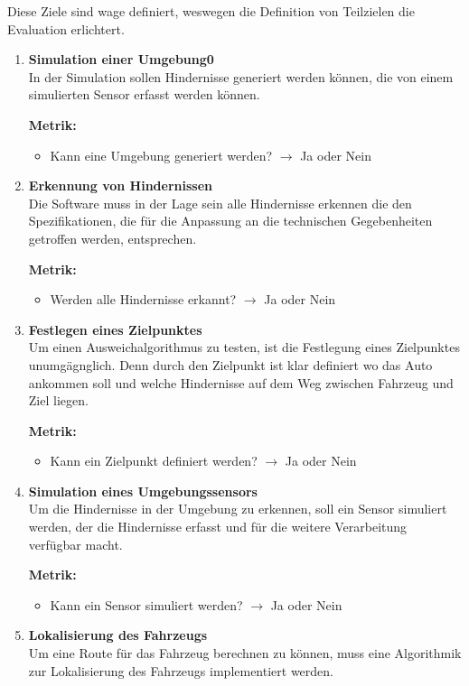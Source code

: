 Diese Ziele sind wage definiert, weswegen die Definition von Teilzielen die Evaluation erlichtert.
\begin{enumerate}[leftmargin=*]
    \item \textbf{Simulation einer Umgebung0}\\
    In der Simulation sollen Hindernisse generiert werden können, die von einem simulierten Sensor erfasst werden können.

    \textbf{Metrik:} 
    \begin{itemize}
        \item Kann eine Umgebung generiert werden? $\to$ Ja oder Nein
    \end{itemize}
    \item \textbf{Erkennung von Hindernissen}\\
    Die Software muss in der Lage sein alle Hindernisse erkennen die den Spezifikationen, 
    die für die Anpassung an die technischen Gegebenheiten getroffen werden, 
    entsprechen.

    \textbf{Metrik:} 
    \begin{itemize}
        \item Werden alle Hindernisse erkannt? $\to$ Ja oder Nein
    \end{itemize}
    \item \textbf{Festlegen eines Zielpunktes}\\
    Um einen Ausweichalgorithmus zu testen, ist die Festlegung eines Zielpunktes unumgägnglich. 
    Denn durch den Zielpunkt ist klar definiert wo das Auto ankommen soll und welche Hindernisse auf dem Weg zwischen Fahrzeug und Ziel liegen.

    \textbf{Metrik:} 
    \begin{itemize}
        \item Kann ein Zielpunkt definiert werden? $\to$ Ja oder Nein
    \end{itemize}
    \item \textbf{Simulation eines Umgebungssensors}\\
    Um die Hindernisse in der Umgebung zu erkennen, soll ein Sensor simuliert werden, der die Hindernisse erfasst und für die weitere Verarbeitung verfügbar macht.

    \textbf{Metrik:}
    \begin{itemize}
        \item Kann ein Sensor simuliert werden? $\to$ Ja oder Nein
    \end{itemize}
    \item \textbf{Lokalisierung des Fahrzeugs}\\
    Um eine Route für das Fahrzeug berechnen zu können, muss eine Algorithmik zur Lokalisierung des Fahrzeugs implementiert werden.


\end{enumerate}
